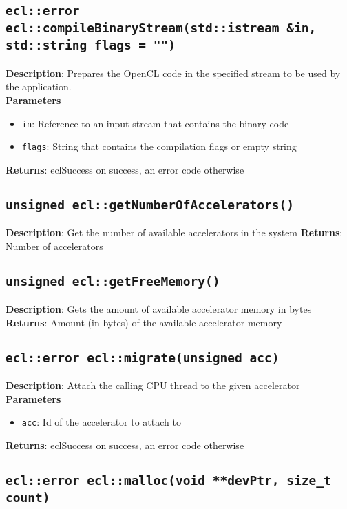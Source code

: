 \subsection{\texttt{ecl::error ecl::compileBinaryStream(std::istream \&in, std::string flags = "")}}

\textbf{Description}: Prepares the OpenCL code in the specified stream to be used by the 
application.  \\
\textbf{Parameters}
\begin{itemize}
  \item \texttt{in}: Reference to an input stream that contains the binary code
  \item \texttt{flags}: String that contains the compilation flags or empty string
\end{itemize}
\textbf{Returns}: eclSuccess on success, an error code otherwise


\subsection{\texttt{unsigned ecl::getNumberOfAccelerators()}}

\textbf{Description}: Get the number of available accelerators in the system
\textbf{Returns}: Number of accelerators

\subsection{\texttt{unsigned ecl::getFreeMemory()}}

\textbf{Description}: Gets the amount of available accelerator memory in bytes
\textbf{Returns}: Amount (in bytes) of the available accelerator memory

\subsection{\texttt{ecl::error ecl::migrate(unsigned acc)}}

\textbf{Description}: Attach the calling CPU thread to the given accelerator
\textbf{Parameters}
\begin{itemize}
  \item \texttt{acc}: Id of the accelerator to attach to
\end{itemize}
\textbf{Returns}: eclSuccess on success, an error code otherwise

\subsection{\texttt{ecl::error ecl::malloc(void **devPtr, size\_t count)}}


